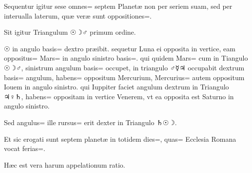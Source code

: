 \begin{parnumbers}

Sequentur igitur sese omnes= septem Planetæ non per seriem suam, sed per interualla laterum, quæ veræ sunt oppositiones=.

Sit igitur Triangulum ☉☽♂ primum ordine.

☉ in angulo basis= dextro præibit. sequetur Luna ei opposita in vertice, eam oppositus= Mars= in angulo sinistro basis=. qui quidem Mars= cum in Tiangulo ☉☽♂, sinistrum angulum basis= occupet, in triangulo ♂☿♃ occupabit dextrum basis= angulum, habens= oppositum Mercurium, Mercurius= autem oppositum Iouem in angulo sinistro. qui Iuppiter faciet angulum dextrum in Triangulo ♃♀♄, habens= oppositam in vertice  Venerem, vt ea opposita est Saturno in angulo sinistro.

Sed angulus= ille rursus= erit dexter in Triangulo ♄☉☽.

Et sic erogati sunt septem planetæ in totidem dies=, quas= Ecclesia Romana vocat ferias=.

Hæc est vera harum appelationum ratio.

\end{parnumbers}

